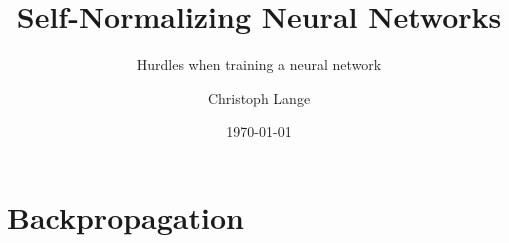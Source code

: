 \documentclass[aspectratio=169]{beamer}
\title{Self-Normalizing Neural Networks}
\subtitle{Hurdles when training a neural network}
\author{Christoph Lange}
\date{\today}
\begin{document}

\begin{frame}
	\maketitle %

\end{frame}


\begin{frame}
	\tableofcontents
\end{frame}


\section{Backpropagation} %

\end{document}
